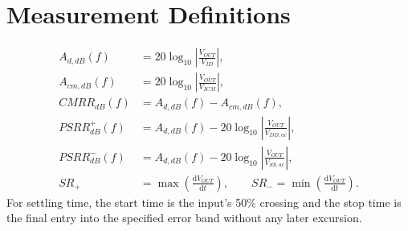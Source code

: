 \documentclass[11pt,a4paper]{report}
\newcommand{\dd}{\mathrm{d}}
\begin{document}
\chapter{Measurement Definitions}
\begin{align}
A_{d,dB}(f)&=20\log_{10}\left|\frac{V_{OUT}}{V_{ID}}\right|,\\
A_{cm,dB}(f)&=20\log_{10}\left|\frac{V_{OUT}}{V_{ICM}}\right|,\\
CMRR_{dB}(f)&=A_{d,dB}(f)-A_{cm,dB}(f),\\
PSRR^+_{dB}(f)&=A_{d,dB}(f)-20\log_{10}\left|\frac{V_{OUT}}{V_{DD,ac}}\right|,\\
PSRR^-_{dB}(f)&=A_{d,dB}(f)-20\log_{10}\left|\frac{V_{OUT}}{V_{SS,ac}}\right|,\\
SR_+&=\max\left(\frac{\dd V_{OUT}}{\dd t}\right),\qquad
SR_-=\min\left(\frac{\dd V_{OUT}}{\dd t}\right).
\end{align}
For settling time, the start time is the input's 50\% crossing and the stop time is the final entry into the specified error band without any later excursion.
\end{document}

